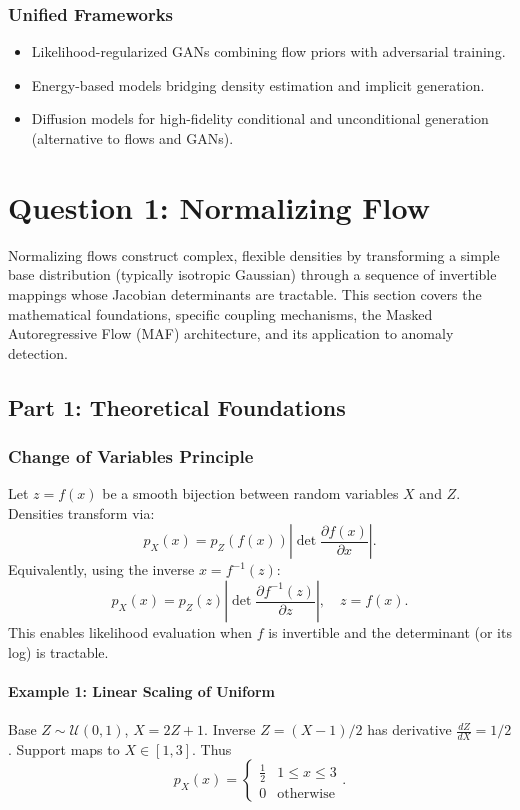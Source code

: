 \documentclass[11pt]{article}
\begin{document}
\subsubsection{Unified Frameworks}
\begin{itemize}
\item Likelihood-regularized GANs combining flow priors with adversarial training.
\item Energy-based models bridging density estimation and implicit generation.
\item Diffusion models for high-fidelity conditional and unconditional generation (alternative to flows and GANs).
\end{itemize}

\tableofcontents

\section{Question 1: Normalizing Flow}
Normalizing flows construct complex, flexible densities by transforming a simple base distribution (typically isotropic Gaussian) through a sequence of invertible mappings whose Jacobian determinants are tractable. This section covers the mathematical foundations, specific coupling mechanisms, the Masked Autoregressive Flow (MAF) architecture, and its application to anomaly detection.

\subsection{Part 1: Theoretical Foundations}

\subsubsection{Change of Variables Principle}
Let $z = f(x)$ be a smooth bijection between random variables $X$ and $Z$. Densities transform via:
\begin{equation}
 p_X(x) = p_Z(f(x)) \left| \det \frac{\partial f(x)}{\partial x} \right|.\label{eq:cov}
\end{equation}
Equivalently, using the inverse $x = f^{-1}(z)$:
\begin{equation}
 p_X(x) = p_Z(z) \left| \det \frac{\partial f^{-1}(z)}{\partial z} \right|,\quad z = f(x).
\end{equation}
This enables likelihood evaluation when $f$ is invertible and the determinant (or its log) is tractable.

\paragraph{Example 1: Linear Scaling of Uniform}
Base $Z \sim \mathcal{U}(0,1)$, $X = 2Z + 1$. Inverse $Z = (X-1)/2$ has derivative $\frac{dZ}{dX}=1/2$. Support maps to $X \in [1,3]$. Thus
\begin{equation}
 p_X(x) = \begin{cases}\frac{1}{2} & 1 \le x \le 3 \\ 0 & \text{otherwise}\end{cases}.
\end{equation}
\end{document}
